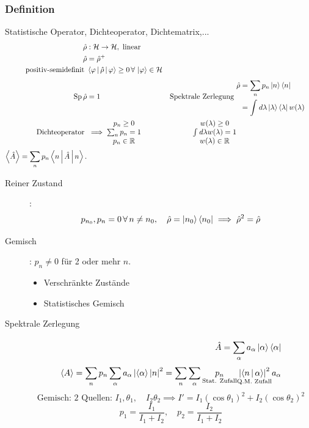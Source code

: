 \documentclass[11pt]{article}
\theoremstyle{plain}
\newcommand{\R}{\mathbb{R}}
\newcommand{\abs}[1]{\left| #1 \right|}
\begin{document}
\subsubsection*{Definition}
Statistische Operator, Dichteoperator, Dichtematrix,...
\begin{align*}
  \hat{\rho} & : \mathcal{H} \to  \mathcal{H}, \text{ linear } \\
  \hat{\rho} & = \hat{\rho}^+ \\
  \text{positiv-semidefinit } & \Braket{\varphi | \hat{\rho}| \varphi} \ge 0 \,\forall\,\Ket{\varphi} \in \mathcal{ H} \\
  \operatorname{Sp} \hat{\rho } & =1  &
  \text{Spektrale Zerlegung } & \begin{split}
  \hat{\rho} &=  \sum_{n}^{} p_n \Ket{n}\Bra{n} \\ &= \int_{}^{} d \lambda \Ket{\lambda}\Bra{\lambda} w(\lambda) 
  \end{split}
   \\
  \text{Dichteoperator } & \implies \begin{matrix} p_n \ge 0 \\ \sum_{n}^{} p_n =1 \\
p_n \in \R \end{matrix} 
&
\begin{matrix} 
  w(\lambda )\ge 0 \\ \int_{}^{} d \lambda w( \lambda )=1 \\ w(\lambda) \in \R 
\end{matrix} \\
  \Braket{\hat{A}}= \sum_{n}^{}p_n \Braket{n|\hat{A}|n}.
\end{align*}
\begin{description}
  \item[Reiner Zustand]: \[ p_{n_0}, p_n =0 \,\forall\, n \neq n_0, \quad  \hat{\rho}= \Ket{n_0}\Bra{n_0} \implies \hat{\rho}^2=\hat{\rho} \]  
  \item[Gemisch]: $p_n \neq 0 $ f\"ur 2 oder mehr $n$.
    \begin{itemize}
      \item Verschr\"ankte Zust\"ande
      \item Statistisches Gemisch
    \end{itemize}
  \item[Spektrale Zerlegung] \begin{align*}
    \hat{A} = \sum_{\alpha}^{}a_ \alpha \Ket{\alpha}\Bra{\alpha} \\
    \Braket{A}= \sum_{n}^{}p_n \sum_{\alpha}^{}a_ \alpha \abs{\Braket{\alpha}| n}^2
    = \sum_{n}^{}\sum_{\alpha}^{} \underset{\text{Stat. Zufall}}{p_n} \underset{\text{Q.M. Zufall}}{\abs{\Braket{n|\alpha}}^2} a_ \alpha
  \end{align*}
  \[ \text{Gemisch: 2 Quellen: } I_1, \theta_1, \quad I_2 \theta_2 \implies 
  I'= I_1 ( \cos{\theta_1})^2 + I_2 (\cos{\theta_2})^2 \] 
  \[ p_1 = \frac{I_1}{I_1 + I_2}, \quad p_2 = \frac{I_2}{I_1 + I_2} \] 
\end{description}
\end{document}
